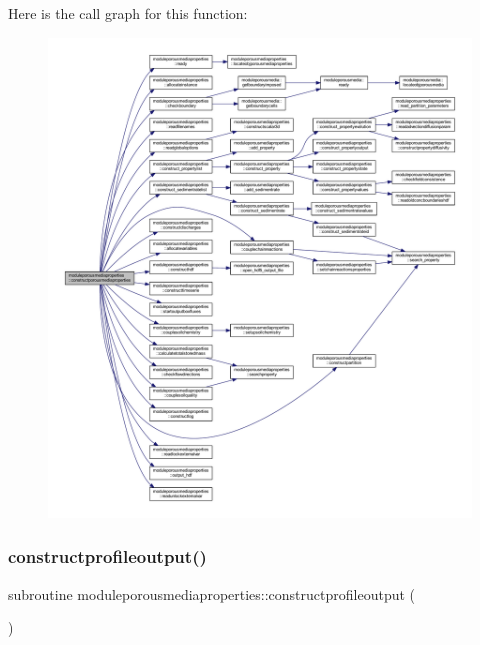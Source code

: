 Here is the call graph for this function\+:\nopagebreak
\begin{figure}[H]
\begin{center}
\leavevmode
\includegraphics[width=350pt]{namespacemoduleporousmediaproperties_a3be1252bc0db9785b9746ae093d82a5f_cgraph}
\end{center}
\end{figure}
\mbox{\label{namespacemoduleporousmediaproperties_a8c45fef7355c15cfadf2a6d30d9bbb24}} 
\subsubsection{\texorpdfstring{constructprofileoutput()}{constructprofileoutput()}}
{\footnotesize\ttfamily subroutine moduleporousmediaproperties\+::constructprofileoutput (\begin{DoxyParamCaption}{ }\end{DoxyParamCaption})\hspace{0.3cm}{\ttfamily [private]}}

